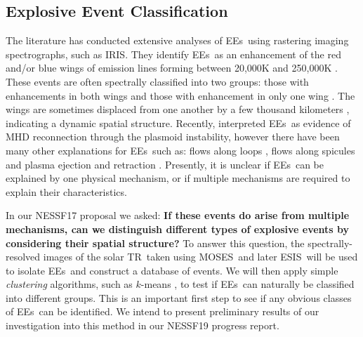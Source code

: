 \documentclass[10pt,letterpaper]{article}
\newcommand{\TR}{\ac{TR}}
\newcommand{\EEs}{\acp{EE}}
\newcommand{\MOSES}{\ac{MOSES}}
\newcommand{\ESIS}{\ac{ESIS}}
\newcommand{\IRIS}{\ac{IRIS}}
\begin{document}
		
		\subsection{Explosive Event Classification}
		
			The literature has conducted extensive analyses of \EEs\ using rastering imaging spectrographs, such as \IRIS.
			They identify \EEs\ as an enhancement of the red and/or blue wings of emission lines forming between 20,000K and 250,000K \citep{Moses1994}.
			These events are often spectrally classified into two groups: those with enhancements in both wings and those with enhancement in only one wing \citep{Dere1989}.
			The wings are sometimes displaced from one another by a few thousand kilometers \citep{Dere1994}, indicating a dynamic spatial structure.
			Recently, \cite{Innes2015} interpreted \EEs\ as evidence of  MHD reconnection through the plasmoid instability, however there have been many other explanations for \EEs\ such as: flows along loops \citep{Teriaca2004}, flows along spicules \citep{Wilhelm2000} and plasma ejection and retraction \citep{Huang2014}.
			Presently, it is unclear if \EEs\ can be explained by one physical mechanism, or if multiple mechanisms are required to explain their characteristics.
			
			In our NESSF17 proposal we asked: \textbf{If these events do arise from multiple mechanisms, can we distinguish different types of explosive events by considering their spatial structure?}
			To answer this question, the spectrally-resolved images of the solar \TR\ taken using \MOSES\ and later \ESIS\ will be used to isolate \EEs\ and construct a database of events.
			We will then apply simple \textit{clustering} algorithms, such as $k$-means \citep{Macqueen1967}, to test if \EEs\ can naturally be classified into different groups.
			This is an important first step to see if any obvious classes of \EEs\ can be identified.
			We intend to present preliminary results of our investigation into this method in our NESSF19 progress report.
			
	
	
	\begin{landscape}
		
	\end{landscape}
	
	
	
\end{document}
